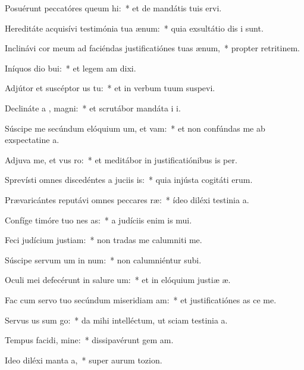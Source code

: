 \item Posuérunt peccatóres queum hi:~* et de mandátis tuis  ervi.
\item Hereditáte acquisívi testimónia tua  ænum:~* quia exsultátio dis i sunt.
\item Inclinávi cor meum ad faciéndas justificatiónes tuas  ænum,~* propter retritinem.
\item Iníquos dio bui:~* et legem am dixi.
\item Adjútor et suscéptor us  tu:~* et in verbum tuum suspevi.
\item Declináte a , magni:~* et scrutábor mandáta i i.
\item Súscipe me secúndum elóquium um, et vam:~* et non confúndas me ab exspectatine a.
\item Adjuva me, et vus ro:~* et meditábor in justificatiónibus is per.
\item Sprevísti omnes discedéntes a juciis is:~* quia injústa cogitáti erum.
\item Prævaricántes reputávi omnes peccares ræ:~* ídeo diléxi testinia a.
\item Confíge timóre tuo nes as:~* a judíciis enim is mui.
\item Feci judícium  justiam:~* non tradas me calumniti me.
\item Súscipe servum um in num:~* non calumniéntur  subi.
\item Oculi mei defecérunt in salure um:~* et in elóquium justiæ æ.
\item Fac cum servo tuo secúndum miseridiam am:~* et justificatiónes as ce me.
\item Servus us sum go:~* da mihi intelléctum, ut sciam testinia a.
\item Tempus facidi, mine:~* dissipavérunt gem am.
\item Ideo diléxi manta a,~* super aurum  tozion.
